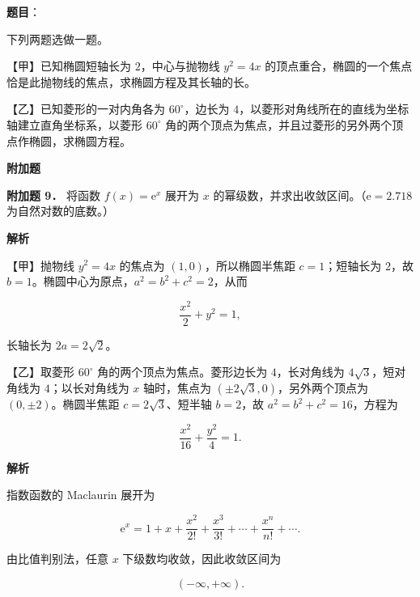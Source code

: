 \begin{answer}

\textbf{题目}：

下列两题选做一题。

【甲】已知椭圆短轴长为 $2$，中心与抛物线 $y^2=4x$ 的顶点重合，椭圆的一个焦点恰是此抛物线的焦点，求椭圆方程及其长轴的长。

【乙】已知菱形的一对内角各为 $60^\circ$，边长为 $4$，以菱形对角线所在的直线为坐标轴建立直角坐标系，以菱形 $60^\circ$ 角的两个顶点为焦点，并且过菱形的另外两个顶点作椭圆，求椭圆方程。

\begin{gktip}
\Needspace{0.25\textheight}
\textbf{附加题}
\end{gktip}

\textbf{附加题 9．} 将函数 $f(x)=\mathrm e^x$ 展开为 $x$ 的幂级数，并求出收敛区间。（$\mathrm e=2.718$ 为自然对数的底数。）

\textbf{解析}

【甲】抛物线 $y^2=4x$ 的焦点为 $(1,0)$，所以椭圆半焦距 $c=1$；短轴长为 $2$，故 $b=1$。椭圆中心为原点，$a^2=b^2+c^2=2$，从而

\nopagebreak[4]
\[
\frac{x^2}{2}+y^2=1,
\]

长轴长为 $2a=2\sqrt2$。

【乙】取菱形 $60^\circ$ 角的两个顶点为焦点。菱形边长为 $4$，长对角线为 $4\sqrt3$，短对角线为 $4$；以长对角线为 $x$ 轴时，焦点为 $(\pm2\sqrt3,0)$，另外两个顶点为 $(0,\pm2)$。椭圆半焦距 $c=2\sqrt3$、短半轴 $b=2$，故 $a^2=b^2+c^2=16$，方程为

\nopagebreak[4]
\[
\frac{x^2}{16}+\frac{y^2}{4}=1.
\]


\textbf{解析}

指数函数的 Maclaurin 展开为

\nopagebreak[4]
\[
\mathrm e^x=1+x+\frac{x^2}{2!}+\frac{x^3}{3!}+\cdots+\frac{x^n}{n!}+\cdots.
\]

由比值判别法，任意 $x$ 下级数均收敛，因此收敛区间为

\nopagebreak[4]
\[
(-\infty,+\infty).
\]


\end{answer}